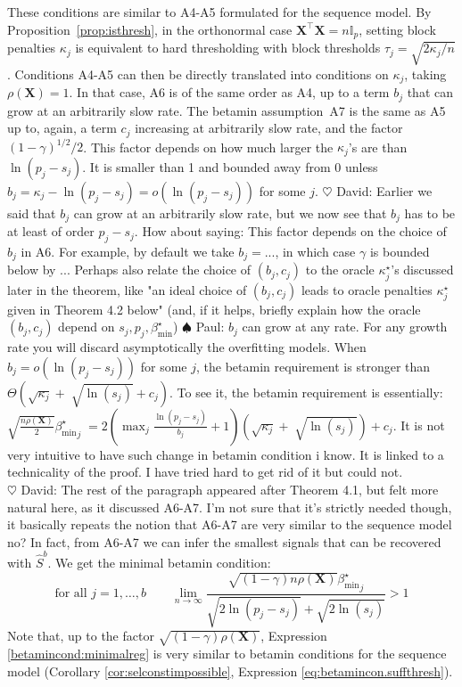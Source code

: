 \documentclass[aos]{imsart}
\theoremstyle{plain}
\newcommand{\david}[1]{{\small{\color{blue} \sf $\heartsuit$ David: #1}}}
\newcommand{\paul}[1]{{\small{\color{green} \sf $\spadesuit$ Paul: #1}}}
\newcommand{\I}{\mathbb{I}}
\newcommand{\bs}{\boldsymbol}
\begin{document}
These conditions are similar to A4-A5 formulated for the sequence model.
 By Proposition~\ref{prop:isthresh}, in the orthonormal %
 case $\bs X^{\top}\bs X=n\I_p$, setting block penalties $\kappa_j$ %
 is equivalent to hard thresholding with block thresholds $\tau_j=\sqrt{2 \kappa_j/n}$.
 Conditions A4-A5 can then be directly translated into conditions on $\kappa_j$, taking $\rho(\bs X)=1$. In that case, A6 is of the same order as A4, up to a term $b_j$ that can grow at an arbitrarily slow rate. The betamin assumption~A7 is the same as A5 up to, again, a term $c_j$ increasing at arbitrarily slow rate, and the factor $(1-\gamma)^{1/2}/2$. This factor depends on how much larger the $\kappa_j$'s are than $\ln(p_j-s_j)$. It is smaller than 1 and bounded away from 0 unless $b_j= \kappa_j - \ln(p_j-s_j)= o(\ln(p_j-s_j))$ for some $j$.
\david{Earlier we said that $b_j$ can grow at an arbitrarily slow rate, but we now see that $b_j$ has to be at least of order $p_j-s_j$. How about saying: This factor depends on the choice of $b_j$ in A6. For example, by default we take $b_j=...$, in which case $\gamma$ is bounded below by ... Perhaps also relate the choice of $(b_j,c_j)$ to the oracle $\kappa_j^\star$'s discussed later in the theorem, like "an ideal choice of $(b_j,c_j)$ leads to oracle penalties $\kappa_j^\star$ given in Theorem 4.2 below" (and, if it helps, briefly explain how the oracle $(b_j,c_j)$ depend on $s_j,p_j,\beta_{\min}^\star$)} \paul{$b_j$ can grow at any rate.  For any growth rate you will discard asymptotically the overfitting models. When $b_j= o(\ln(p_j-s_j))$ for some $j$, the betamin requirement is stronger than $\Theta(\sqrt{\kappa_j} +\; \sqrt{\ln(s_j)} + c_{j})$. To see it, the betamin requirement is essentially: $\sqrt{\frac{ n\rho(\bs X)}{2}}{{\beta_{\min}^{\star}}_j}  \;=2(\max_j\frac{\ln(p_j-s_j)}{b_j}+1)(\sqrt{\kappa_j} +\; \sqrt{\ln(s_j)}) + c_{j}$. It is not very intuitive to have such change in betamin condition i know. It is linked to a technicality of the proof. I have tried hard to get rid of it but could not. \\}
\david{The rest of the paragraph appeared after Theorem 4.1, but felt more natural here, as it discussed A6-A7. I'm not sure that it's strictly needed though, it basically repeats the notion that A6-A7 are very similar to the sequence model no?} In fact, from A6-A7 we can infer the smallest signals that can be recovered with $\hat{S}^{b}$. %
We get the minimal betamin condition:
\begin{equation}\label{betamincond:minimalreg} \mbox{for all }j=1,\ldots,b \qquad
    \lim_{n\to \infty}\frac{\sqrt{(1-\gamma) n\rho(\bs X)}{\beta_{\min}^{\star}}_j}{\sqrt{2\ln(p_j-s_j)} + \sqrt{2\ln(s_j)}} >1
\end{equation}
Note that, up to the factor $\sqrt{(1-\gamma)\rho(\bs X)}$, Expression \eqref{betamincond:minimalreg} is very similar to betamin conditions for the sequence model (Corollary \ref{cor:selconstimpossible}, Expression \eqref{eq:betamincon.suffthresh}).
\end{document}
